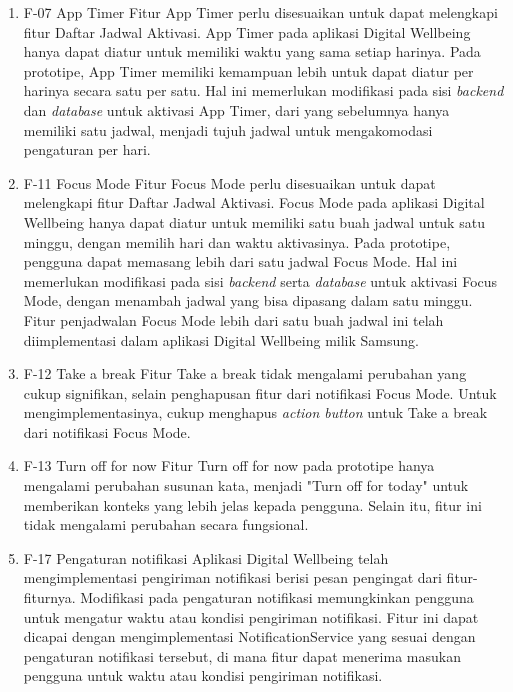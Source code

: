 \begin{enumerate}
  \item F-07 App Timer
  \subitem Fitur App Timer perlu disesuaikan untuk dapat melengkapi fitur Daftar Jadwal Aktivasi. App Timer pada aplikasi Digital Wellbeing hanya dapat diatur untuk memiliki waktu yang sama setiap harinya. Pada prototipe, App Timer memiliki kemampuan lebih untuk dapat diatur per harinya secara satu per satu. Hal ini memerlukan modifikasi pada sisi \textit{backend} dan \textit{database} untuk aktivasi App Timer, dari yang sebelumnya hanya memiliki satu jadwal, menjadi tujuh jadwal untuk mengakomodasi pengaturan per hari. 
    
  \item F-11 Focus Mode
  \subitem Fitur Focus Mode perlu disesuaikan untuk dapat melengkapi fitur Daftar Jadwal Aktivasi. Focus Mode pada aplikasi Digital Wellbeing hanya dapat diatur untuk memiliki satu buah jadwal untuk satu minggu, dengan memilih hari dan waktu aktivasinya. Pada prototipe, pengguna dapat memasang lebih dari satu jadwal Focus Mode. Hal ini memerlukan modifikasi pada sisi \textit{backend} serta \textit{database} untuk aktivasi Focus Mode, dengan menambah jadwal yang bisa dipasang dalam satu minggu. Fitur penjadwalan Focus Mode lebih dari satu buah jadwal ini telah diimplementasi dalam aplikasi Digital Wellbeing milik Samsung. 
    
  \item F-12 Take a break
  \subitem Fitur Take a break tidak mengalami perubahan yang cukup signifikan, selain penghapusan fitur dari notifikasi Focus Mode. Untuk mengimplementasinya, cukup menghapus \textit{action button} untuk Take a break dari notifikasi Focus Mode.
    
  \item F-13 Turn off for now
  \subitem Fitur Turn off for now pada prototipe hanya mengalami perubahan susunan kata, menjadi "Turn off for today" untuk memberikan konteks yang lebih jelas kepada pengguna. Selain itu, fitur ini tidak mengalami perubahan secara fungsional.
    
  \item F-17 Pengaturan notifikasi
  \subitem Aplikasi Digital Wellbeing telah mengimplementasi pengiriman notifikasi berisi pesan pengingat dari fitur-fiturnya. Modifikasi pada pengaturan notifikasi memungkinkan pengguna untuk mengatur waktu atau kondisi pengiriman notifikasi. Fitur ini dapat dicapai dengan mengimplementasi NotificationService yang sesuai dengan pengaturan notifikasi tersebut, di mana fitur dapat menerima masukan pengguna untuk waktu atau kondisi pengiriman notifikasi.
    

\end{enumerate}
